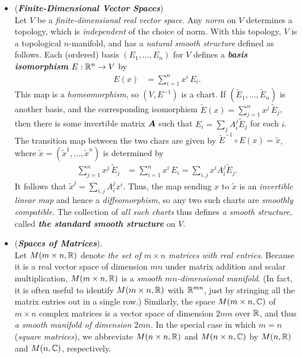 \documentclass[11pt]{article}
\begin{document}
\begin{itemize}
\item \begin{example} (\emph{\textbf{Finite-Dimensional Vector Spaces}})\\
Let $V$ be a \emph{finite-dimensional real vector space}. Any \emph{norm} on $V$ determines a topology, which is \emph{independent} of the choice of norm. With this topology, $V$ is a topological $n$-manifold, and has a \emph{natural smooth structure} defined as follows. Each (ordered) basis $(E_1,\ldots, E_n)$ for $V$ defines a \emph{\textbf{basis isomorphism}} $E: {\mathbb R}^n \rightarrow V$ by
\begin{align*}
E(x) &= \sum_{i=1}^{n}x^{i}\,E_{i}.
\end{align*} This map is a \emph{homeomorphism}, so $(V, E^{-1})$ is a chart. If $(\widetilde{E}_1,\ldots, \widetilde{E}_n)$ is another basis, and the corresponding isomorphism $\widetilde{E}(x) = \sum_{j=1}^{n}x^{j}\,\widetilde{E}_{j}$, then there is some
invertible matrix $\boldsymbol{A}$ such that $E_i = \sum_{j}A_{i}^{j}\widetilde{E}_{j}$ for each $i$. The transition map between the two chars are given by $\widetilde{E}^{-1}\circ E(x) = \widetilde{x}$,  where $\widetilde{x} = (\widetilde{x}^{1},\ldots, \widetilde{x}^{n})$ is determined by
\begin{align*}
\sum_{j=1}^{n}x^{j}\,\widetilde{E}_{j} &= \sum_{i=1}^{n}x^{i}\,E_{i} = \sum_{i,j}x^{i}A_{i}^{j}\widetilde{E}_{j}.
\end{align*} It follows that $\widetilde{x}^{j} = \sum_{i,j}A_{i}^{j}x^{i}$. Thus, the map sending $x$ to $\widetilde{x}$ is an \emph{invertible linear map} and hence a \emph{diffeomorphism}, so any two such charts are \emph{smoothly compatible}. The collection of \emph{all such charts} thus defines \emph{a smooth structure}, called \textbf{\emph{the standard smooth structure}} on $V$.
\end{example}

\item \begin{example} (\emph{\textbf{Spaces of Matrices}}).\\
Let $M(m \times n, {\mathbb R})$ denote \emph{the set of $m \times n$ matrices with real entries}. Because it is a real vector space of dimension $mn$ under matrix addition and scalar multiplication, $M(m \times n, {\mathbb R})$  is a \emph{smooth $mn$-dimensional manifold}. (In fact, it is often useful to identify $M(m \times n, {\mathbb R})$ with ${\mathbb R}^{mn}$, just by stringing all the matrix entries out in a single row.) Similarly, the space $M(m \times n, {\mathbb C})$ of $m \times n$ complex matrices is a vector space of dimension $2mn$ over ${\mathbb R}$, and thus \emph{a smooth manifold of dimension $2mn$}. In the special case in which $m = n$ (\emph{square matrices}), we abbreviate $M(n \times n, {\mathbb R})$ and $M(n \times n, {\mathbb C})$ by $M(n, {\mathbb R})$ and $M(n, {\mathbb C})$, respectively.
\end{example}


\end{itemize}
\end{document}
